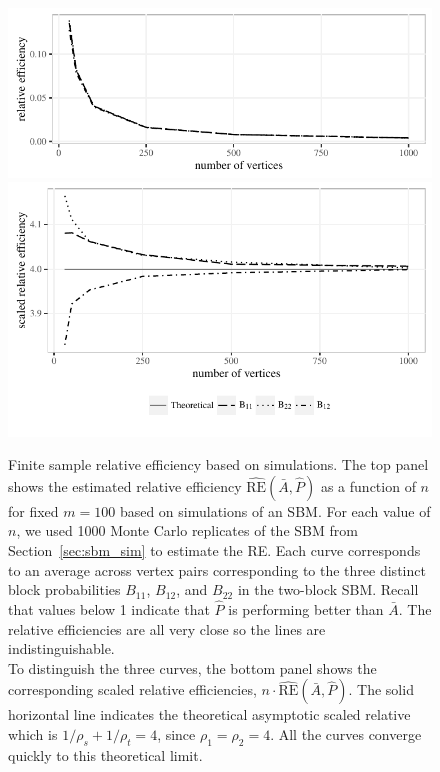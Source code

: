 \begin{figure}[!htbp]
\centering
\includegraphics[width=1\textwidth]{./Figures/RE.pdf}
\includegraphics[width=1\textwidth]{./Figures/scaled_RE.pdf}
\caption[Finite sample relative efficiency based on simulations]{Finite sample relative efficiency based on simulations.
The top panel shows the estimated relative efficiency $\hat{\mathrm{RE}}(\bar{A},\hat{P})$ as a function of $n$ for fixed $m=100$ based on simulations of an SBM. 
For each value of $n$, we used 1000 Monte Carlo replicates of the SBM from Section~\ref{sec:sbm_sim} to estimate the RE.
Each curve corresponds to an average across vertex pairs corresponding to the three distinct block probabilities $B_{11}$, $B_{12}$, and $B_{22}$ in the two-block SBM.
Recall that values below 1 indicate that $\hat{P}$ is performing better than $\bar{A}$.
The relative efficiencies are all very close so the lines are indistinguishable. \\
To distinguish the three curves, the bottom panel shows the corresponding scaled relative efficiencies, $n \cdot \hat{\mathrm{RE}}(\bar{A},\hat{P})$.
The solid horizontal line indicates the theoretical asymptotic scaled relative which is  $1/\rho_s+1/\rho_t=4$, since $\rho_1=\rho_2=4$.
All the curves converge quickly to this theoretical limit. }
\label{fig:RE}
\end{figure}


